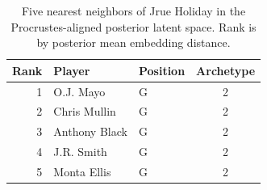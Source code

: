 \begin{table}[htbp]
  \centering\small
  \begin{tabular}{rllc}
    \toprule
    Rank & Player & Position & Archetype \\
    \midrule
    1 & O.J. Mayo & G & 2 \\
    2 & Chris Mullin & G & 2 \\
    3 & Anthony Black & G & 2 \\
    4 & J.R. Smith & G & 2 \\
    5 & Monta Ellis & G & 2 \\
    \bottomrule
  \end{tabular}
  \caption{Five nearest neighbors of Jrue Holiday in the Procrustes-aligned posterior latent space. Rank is by posterior mean embedding distance.}
  \label{tab:Jrue_Holiday_neighbors}
\end{table}

